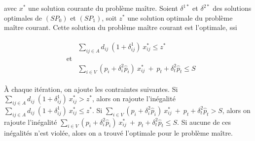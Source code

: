 \documentclass[11pt,a4paper]{exam}
\begin{document}
\begin{questions}
avec $x^{*}$ une solution courante du problème maître. Soient $\delta^{1*}$ et $\delta^{2*}$ des solutions optimales de $\left(SP_{0}\right)$ et $\left(SP_{1}\right)$, soit $z^{*}$ une solution optimale du problème maître courant. Cette solution du problème maître courant est l'optimale, ssi 

\begin{align*}
\begin{array}{lll}
	& &\sum\limits_{ij \in A} d_{ij} \ (1 + \delta^{1}_{ij}) \ x^{*}_{ij} \leq z^{*}\\
	&\text{et}\\
	& &\sum\limits_{i \in V} (p_{i} + \delta^{2}_{i} \hat{p}_{i}) \ x^{*}_{ij}\ +\ p_{t} + \delta^{2}_{t} \hat{p}_{t} \leq S
\end{array}
\end{align*}

À chaque itération, on ajoute les contraintes suivantes. Si $\sum\limits_{ij \in A} d_{ij} \ (1 + \delta^{1}_{ij}) \ x^{*}_{ij} > z^{*}$, alors on rajoute l'inégalité $\sum\limits_{ij \in A} d_{ij} \ (1 + \delta^{1}_{ij}) \ x^{*}_{ij} \leq z^{*}$. Si $\sum\limits_{i \in V} (p_{i} + \delta^{2}_{i} \hat{p}_{i}) \ x^{*}_{ij}\ +\ p_{t} + \delta^{2}_{t} \hat{p}_{t} > S$, alors on rajoute l'inégalité $\sum\limits_{i \in V} (p_{i} + \delta^{2}_{i} \hat{p}_{i}) \ x^{*}_{ij}\ +\ p_{t} + \delta^{2}_{t} \hat{p}_{t} \leq S$. Si aucune de ces inégalités n'est violée, alors on a trouvé l'optimale pour le problème maître.

\end{questions}
\end{document}
